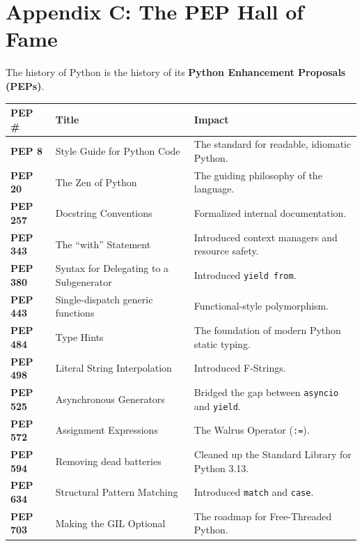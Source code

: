 \hypertarget{appendix-c-the-pep-hall-of-fame}{%
\chapter{Appendix C: The PEP Hall of
Fame}\label{appendix-c-the-pep-hall-of-fame}}

The history of Python is the history of its \textbf{Python Enhancement
Proposals (PEPs)}.

\begin{longtable}[]{@{}
  >{\raggedright\arraybackslash}p{}
  >{\raggedright\arraybackslash}p{}
  >{\raggedright\arraybackslash}p{}@{}}
\toprule
PEP \# & Title & Impact \\
\midrule
\endhead
\textbf{PEP 8} & Style Guide for Python Code & The standard for
readable, idiomatic Python. \\
\textbf{PEP 20} & The Zen of Python & The guiding philosophy of the
language. \\
\textbf{PEP 257} & Docstring Conventions & Formalized internal
documentation. \\
\textbf{PEP 343} & The ``with'' Statement & Introduced context managers
and resource safety. \\
\textbf{PEP 380} & Syntax for Delegating to a Subgenerator & Introduced
\passthrough{\lstinline!yield from!}. \\
\textbf{PEP 443} & Single-dispatch generic functions & Functional-style
polymorphism. \\
\textbf{PEP 484} & Type Hints & The foundation of modern Python static
typing. \\
\textbf{PEP 498} & Literal String Interpolation & Introduced
F-Strings. \\
\textbf{PEP 525} & Asynchronous Generators & Bridged the gap between
\passthrough{\lstinline!asyncio!} and
\passthrough{\lstinline!yield!}. \\
\textbf{PEP 572} & Assignment Expressions & The Walrus Operator
(\passthrough{\lstinline!:=!}). \\
\textbf{PEP 594} & Removing dead batteries & Cleaned up the Standard
Library for Python 3.13. \\
\textbf{PEP 634} & Structural Pattern Matching & Introduced
\passthrough{\lstinline!match!} and \passthrough{\lstinline!case!}. \\
\textbf{PEP 703} & Making the GIL Optional & The roadmap for
Free-Threaded Python. \\
\bottomrule
\end{longtable}

